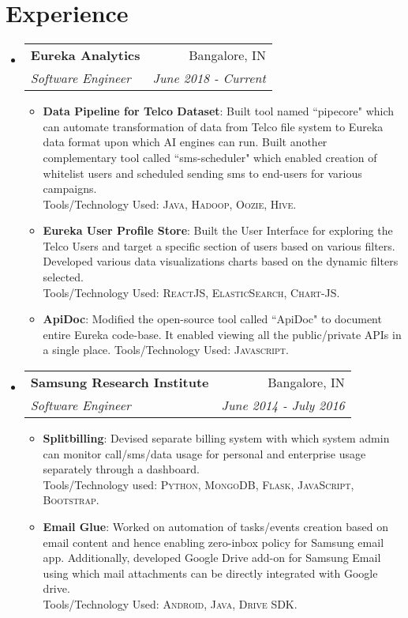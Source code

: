 \documentclass[letterpaper,10.8pt]{article}
\makeatletter
\newcommand{\resumeItem}[2]{
  \item\small{
    \textbf{#1}{: #2 \vspace{-2pt}}
  }
}
\newcommand{\resumeSubheading}[4]{
  \vspace{-1pt}\item
    \begin{tabular*}{0.97\textwidth}{l@{\extracolsep{\fill}}r}
      \textbf{#1} & #2 \\
      \textit{\small#3} & \textit{\small #4} \\
    \end{tabular*}\vspace{-5pt}
}
\newcommand{\resumeSubHeadingListStart}{\begin{itemize}[leftmargin=*]}
\newcommand{\resumeSubHeadingListEnd}{\end{itemize}}
\newcommand{\resumeItemListStart}{\begin{itemize}}
\newcommand{\resumeItemListEnd}{\end{itemize}\vspace{-5pt}}
\makeatother
\begin{document}
\section{Experience}
  \resumeSubHeadingListStart
    \resumeSubheading
    {Eureka Analytics}{Bangalore, IN}
    {Software Engineer}{June 2018 -  Current}
    \resumeItemListStart
        \resumeItem{Data Pipeline for Telco Dataset}
          {Built tool named ``pipecore" which can automate transformation of data from Telco file system to Eureka data format upon which AI engines can run. Built another complementary tool called ``sms-scheduler" which enabled creation of whitelist users and scheduled sending sms to end-users for various campaigns. \\ Tools/Technology Used: \textsc{Java, Hadoop, Oozie, Hive}.}
          \resumeItem{Eureka User Profile Store}
          {Built the User Interface for exploring the Telco Users and target a specific section of users based on various filters. Developed various data visualizations charts based on the dynamic filters selected. \\ Tools/Technology Used: \textsc{ReactJS, ElasticSearch, Chart-JS}.}
          \resumeItem{ApiDoc}{Modified the open-source tool called ``ApiDoc" to document entire Eureka code-base. It enabled viewing all the public/private APIs in a single place. Tools/Technology Used: \textsc{Javascript}.}
      \resumeItemListEnd
      
    \resumeSubheading
		{Samsung Research Institute}{Bangalore, IN}
		{Software Engineer}{June 2014 -  July 2016}
		\resumeItemListStart
        \resumeItem{Splitbilling}
          {Devised separate billing system with which system admin can monitor call/sms/data usage for personal and enterprise usage separately through a dashboard. \\ Tools/Technology used: \textsc{Python, MongoDB, Flask, JavaScript, Bootstrap}.}
        \resumeItem{Email Glue}
          {Worked on automation of tasks/events creation based on email content and hence enabling zero-inbox policy for Samsung email app. Additionally, developed Google Drive add-on for Samsung Email using which mail attachments can be directly integrated with Google drive. \\ Tools/Technology Used: \textsc{Android, Java, Drive SDK}.}
		\resumeItemListEnd
\resumeSubHeadingListEnd

\end{document}
